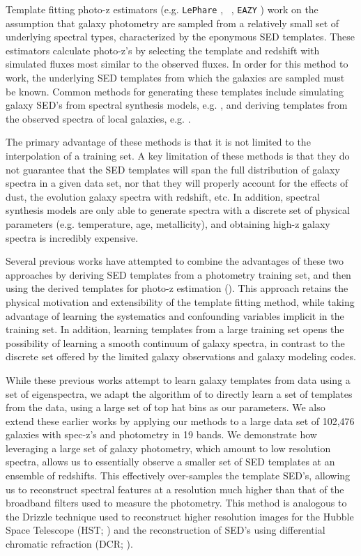 Template fitting photo-z estimators (e.g. \texttt{LePhare} \citealt{Arnouts1999}, \bpz\ \citealt{Benitez2000a}, \texttt{EAZY} \citealt{Brammer2008}) work on the assumption that galaxy photometry are sampled from a relatively small set of underlying spectral types, characterized by the eponymous SED templates. 
These estimators calculate photo-z's by selecting the template and redshift with simulated fluxes most similar to the observed fluxes. 
In order for this method to work, the underlying SED templates from which the galaxies are sampled must be known. 
Common methods for generating these templates include simulating galaxy SED's from spectral synthesis models, e.g. \citet{BruzualA.1993a}, and deriving templates from the observed spectra of local galaxies, e.g. \citet{Benitez2004a}. 

The primary advantage of these methods is that it is not limited to the interpolation of a training set. 
A key limitation of these methods is that they do not guarantee that the SED templates will span the full distribution of galaxy spectra in a given data set, nor that they will properly account for the effects of dust, the evolution galaxy spectra with redshift, etc.
In addition, spectral synthesis models are only able to generate spectra with a discrete set of physical parameters (e.g. temperature, age, metallicity), and obtaining high-z galaxy spectra is incredibly expensive.

Several previous works have attempted to combine the advantages of these two approaches by deriving SED templates from a photometry training set, and then using the derived templates for photo-z estimation (\citealt{Budavari2000b,Csabai2000,Kalmbach2017}).
This approach retains the physical motivation and extensibility of the template fitting method, while taking advantage of learning the systematics and confounding variables implicit in the training set.
In addition, learning templates from a large training set opens the possibility of learning a smooth continuum of galaxy spectra, in contrast to the discrete set offered by the limited galaxy observations and galaxy modeling codes.

While these previous works attempt to learn galaxy templates from data using a set of eigenspectra, we adapt the algorithm of \citet{Budavari2000b} to directly learn a set of templates from the data, using a large set of top hat bins as our parameters.
We also extend these earlier works by applying our methods to a large data set of 102,476 galaxies with spec-z's and photometry in 19 bands.
We demonstrate how leveraging a large set of galaxy photometry, which amount to low resolution spectra, allows us to essentially observe a smaller set of SED templates at an ensemble of redshifts.
This effectively over-samples the template SED's, allowing us to reconstruct spectral features at a resolution much higher than that of the broadband filters used to measure the photometry.
This method is analogous to the Drizzle technique used to reconstruct higher resolution images for the Hubble Space Telescope (HST; \citealt{Fruchter2002}) and the reconstruction of SED's using differential chromatic refraction (DCR; \citealt{Lee2019}).

